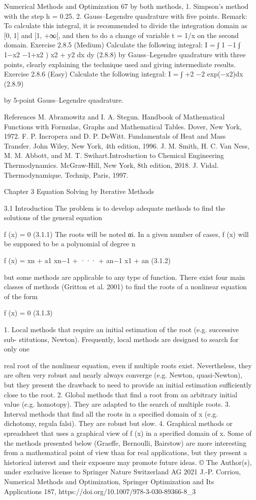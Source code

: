 \documentclass[letterpaper,12pt]{article}
\begin{document}
Numerical Methods and Optimization 67
by both methods,
1. Simpson’s method with the step h = 0.25.
2. Gauss–Legendre quadrature with five points.
Remark: To calculate this integral, it is recommended to divide the integration
domain as [0, 1] and [1, +∞[, and then to do a change of variable t = 1/x on the second
domain.
Exercise 2.8.5 (Medium)
Calculate the following integral:
I =
∫ 1
−1
∫ 1−x2
−1+x2
)
x2 + y2 dx dy (2.8.8)
by Gauss–Legendre quadrature with three points, clearly explaining the technique used
and giving intermediate results.
Exercise 2.8.6 (Easy)
Calculate the following integral:
I =
∫ +2
−2
exp(−x2)dx (2.8.9)

by 5-point Gauss–Legendre quadrature.

References
M. Abramowitz and I. A. Stegun. Handbook of Mathematical Functions with Formulas,
Graphs and Mathematical Tables. Dover, New York, 1972.
F. P. Incropera and D. P. DeWitt. Fundamentals of Heat and Mass Transfer. John
Wiley, New York, 4th edition, 1996.
J. M. Smith, H. C. Van Ness, M. M. Abbott, and M. T. Swihart.Introduction to Chemical
Engineering Thermodynamics. McGraw-Hill, New York, 8th edition, 2018.
J. Vidal. Thermodynamique. Technip, Paris, 1997.

Chapter 3
Equation Solving by Iterative Methods

3.1 Introduction
The problem is to develop adequate methods to find the solutions of the general
equation

f (x) = 0 (3.1.1)
The roots will be noted αi. In a given number of cases, f (x) will be supposed to be a
polynomial of degree n

f (x) = xn + a1 xn−1 + ··· + an−1 x1 + an (3.1.2)

but some methods are applicable to any type of function.
There exist four main classes of methods (Gritton et al. 2001) to find the roots of a
nonlinear equation of the form

f (x) = 0 (3.1.3)

1. Local methods that require an initial estimation of the root (e.g. successive sub-
stitutions, Newton). Frequently, local methods are designed to search for only one

real root of the nonlinear equation, even if multiple roots exist. Nevertheless, they
are often very robust and nearly always converge (e.g. Newton, quasi-Newton), but
they present the drawback to need to provide an initial estimation sufficiently close
to the root.
2. Global methods that find a root from an arbitrary initial value (e.g. homotopy). They
are adapted to the search of multiple roots.
3. Interval methods that find all the roots in a specified domain of x (e.g. dichotomy,
regula falsi). They are robust but slow.
4. Graphical methods or spreadsheet that uses a graphical view of f (x) in a specified
domain of x.
Some of the methods presented below (Graeffe, Bernoulli, Bairstow) are more
interesting from a mathematical point of view than for real applications, but they
present a historical interest and their exposure may promote future ideas.
© The Author(s), under exclusive license to Springer Nature Switzerland AG 2021
J.-P. Corriou, Numerical Methods and Optimization, Springer Optimization and Its
Applications 187, https://doi.org/10.1007/978-3-030-89366-8_3
\end{document}
